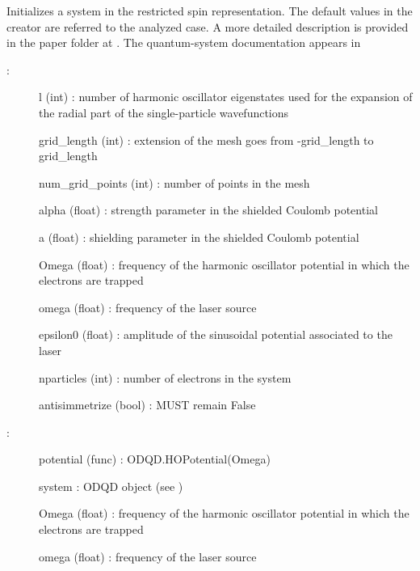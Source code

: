 \documentclass[letterpaper,10pt,english]{sphinxmanual}
\begin{document}
\begin{fulllineitems}
\label{\detokenize{index:do.RHF}}
Initializes a system in the restricted spin representation. The default values in the creator are referred to the analyzed case.
A more detailed description is provided in the paper folder at  .
The quantum-system documentation appears in 
\begin{description}
\item[{:}] \leavevmode
l (int) : number of harmonic oscillator eigenstates used for the expansion of the radial part of the single-particle wavefunctions

grid\_length (int) : extension of the mesh goes from -grid\_length to grid\_length

num\_grid\_points (int) : number of points in the mesh

alpha (float) : strength parameter in the shielded Coulomb potential

a (float) : shielding parameter in the shielded Coulomb potential

Omega (float) : frequency of the harmonic oscillator potential in which the electrons are trapped

omega (float) : frequency of the laser source

epsilon0 (float) : amplitude of the sinusoidal potential associated to the laser

nparticles (int) : number of electrons in the system

antisimmetrize (bool) : MUST remain False

\item[{:}] \leavevmode
potential (func) : ODQD.HOPotential(Omega)

system : ODQD object (see )

Omega (float) : frequency of the harmonic oscillator potential in which the electrons are trapped

omega (float) : frequency of the laser source


\end{description}
\end{fulllineitems}
\end{document}

